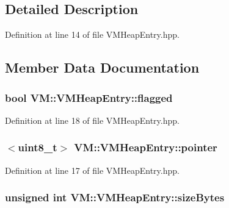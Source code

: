 \subsection{Detailed Description}


Definition at line 14 of file V\-M\-Heap\-Entry.\-hpp.



\subsection{Member Data Documentation}
\hypertarget{struct_v_m_1_1_v_m_heap_entry_add28c938f66af42411e53299d4254742}{
\subsubsection[{flagged}]{\setlength{\rightskip}{0pt plus 5cm}bool V\-M\-::\-V\-M\-Heap\-Entry\-::flagged}}\label{struct_v_m_1_1_v_m_heap_entry_add28c938f66af42411e53299d4254742}


Definition at line 18 of file V\-M\-Heap\-Entry.\-hpp.

\hypertarget{struct_v_m_1_1_v_m_heap_entry_a72120cd58ce16845b5e42c1085d9ed7e}{
\subsubsection[{pointer}]{$<$uint8\-\_\-t$>$ V\-M\-::\-V\-M\-Heap\-Entry\-::pointer}}\label{struct_v_m_1_1_v_m_heap_entry_a72120cd58ce16845b5e42c1085d9ed7e}


Definition at line 17 of file V\-M\-Heap\-Entry.\-hpp.

\hypertarget{struct_v_m_1_1_v_m_heap_entry_add1ede23c9111ec87cdaa0d4376c9705}{
\subsubsection[{size\-Bytes}]{\setlength{\rightskip}{0pt plus 5cm}unsigned int V\-M\-::\-V\-M\-Heap\-Entry\-::size\-Bytes}}\label{struct_v_m_1_1_v_m_heap_entry_add1ede23c9111ec87cdaa0d4376c9705}


